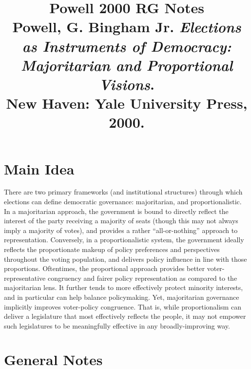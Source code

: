 \documentclass[12pt]{article}
\title{\textbf{Powell 2000 RG Notes}\\
\large Powell, G. Bingham Jr. \textit{Elections as Instruments of Democracy: Majoritarian and Proportional Visions}.\\
New Haven: Yale University Press, 2000.}
\author{}
\date{}
\begin{document}
\maketitle

\section{Main Idea}

There are two primary frameworks (and institutional structures) through which elections can define democratic governance: majoritarian, and proportionalistic. In a majoritarian approach, the government is bound to directly reflect the interest of the party receiving a majority of seats (though this may not always imply a majority of votes), and provides a rather ``all-or-nothing'' approach to representation. Conversely, in a proportionalistic system, the government ideally reflects the proportionate makeup of policy preferences and perspectives throughout the voting population, and delivers policy influence in line with those proportions. Oftentimes, the proportional approach provides better voter-representative congruency and fairer policy representation as compared to the majoritarian lens. It further tends to more effectively protect minority interests, and in particular can help balance policymaking. Yet, majoritarian governance implicitly improves voter-policy congruence. That is, while proportionalism can deliver a legislature that most effectively reflects the people, it may not empower such legislatures to be meaningfully effective in any broadly-improving way.



\section{General Notes}
\end{document}
